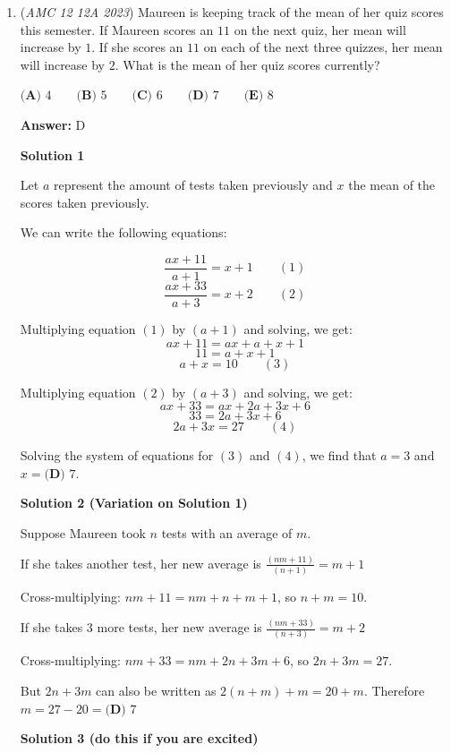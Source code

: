 \begin{enumerate}
 


 


 


	\item (\textit{AMC 12 12A 2023}) Maureen is keeping track of the mean of her quiz scores this semester. If Maureen scores an $11$ on the next quiz, her mean will increase by $1$. If she scores an $11$ on each of the next three quizzes, her mean will increase by $2$. What is the mean of her quiz scores currently?


 $\textbf{(A) }4\qquad\textbf{(B) }5\qquad\textbf{(C) }6\qquad\textbf{(D) }7\qquad\textbf{(E) }8$

 \textbf{Answer: }D



\textbf{Solution 1}

Let $a$ represent the amount of tests taken previously and $x$ the mean of the scores taken previously. 

 We can write the following equations:

 
 \[\frac{ax+11}{a+1}=x+1\qquad (1)\]
 \[\frac{ax+33}{a+3}=x+2\qquad (2)\]

 Multiplying equation $(1)$ by $(a+1)$ and solving, we get:
 \[ax+11=ax+a+x+1\]
 \[11=a+x+1\]
 \[a+x=10\qquad (3)\]

 Multiplying equation $(2)$ by $(a+3)$ and solving, we get:
 \[ax+33=ax+2a+3x+6\]
 \[33=2a+3x+6\]
 \[2a+3x=27\qquad (4)\]

 Solving the system of equations for $(3)$ and $(4)$, we find that $a=3$ and $x=\boxed{\textbf{(D) }7}$.

 



\textbf{Solution 2 (Variation on Solution 1)}

Suppose Maureen took $n$ tests with an average of $m$.

 If she takes another test, her new average is $\frac{(nm+11)}{(n+1)}=m+1$

 Cross-multiplying: $nm+11=nm+n+m+1$, so $n+m=10$.

 If she takes $3$ more tests, her new average is $\frac{(nm+33)}{(n+3)}=m+2$

 Cross-multiplying: $nm+33=nm+2n+3m+6$, so $2n+3m=27$.

 But $2n+3m$ can also be written as $2(n+m)+m=20+m$. Therefore $m=27-20=\boxed{\textbf{(D) }7}$




\textbf{Solution 3 (do this if you are excited)}


\end{enumerate}
